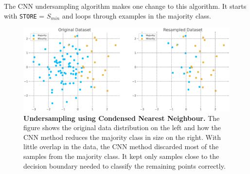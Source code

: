 The CNN undersampling algorithm makes one change to this algorithm. It starts with \texttt{STORE} =
$S_{min}$ and loops through examples in the majority class.

\begin{figure}
    \centering
    \includegraphics[width=\linewidth]{figures/cnn.eps}
    \caption{
        \textbf{Undersampling using Condensed Nearest Neighbour.} The figure shows the original
        data distribution on the left and how the CNN method reduces the majority class in size on
        the right. With little overlap in the data, the CNN method discarded most of the samples
        from the majority class. It kept only samples close to the decision boundary needed to
        classify the remaining points correctly.
    }
    \label{figure:cnn}
\end{figure}
